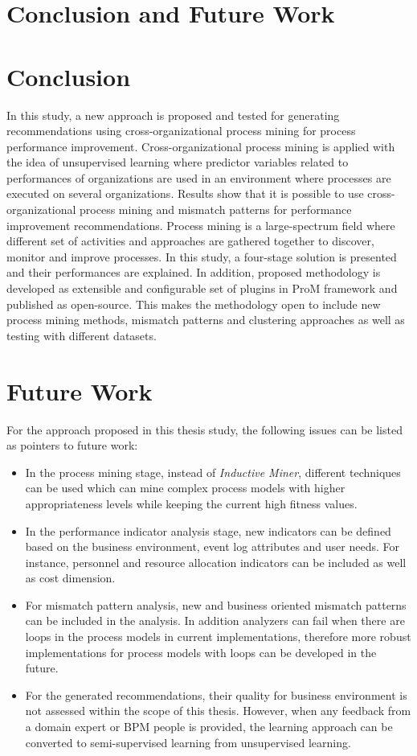 \section{Conclusion and Future Work}
\label{sec:conclusion-and-future-work}

\section{Conclusion}

In this study, a new approach is proposed and tested for generating recommendations using cross-organizational process mining for process performance improvement. Cross-organizational process mining is applied with the idea of unsupervised learning where predictor variables related to performances of organizations are used in an environment where processes are executed on several organizations. Results show that it is possible to use cross-organizational process mining and mismatch patterns for performance improvement recommendations. Process mining is a large-spectrum field where different set of activities and approaches are gathered together to discover, monitor and improve processes. In this  study, a four-stage solution is presented and their performances are explained. In addition, proposed methodology is developed as extensible and configurable set of plugins in ProM framework \cite{verbeek2010prom} and published as open-source. This makes the methodology open to include new process mining methods, mismatch patterns and clustering approaches as well as testing with different datasets.

\section{Future Work}

For the approach proposed in this thesis study, the following issues can be listed as pointers to future work:
\begin{itemize}
	\item In the process mining stage, instead of \textit{Inductive Miner}, different techniques can be used which can mine complex process models with higher appropriateness levels while keeping the current high fitness values.
	\item In the performance indicator analysis stage, new indicators can be defined based on the business environment, event log attributes and user needs. For instance, personnel and resource allocation indicators can be included as well as cost dimension.
	\item For mismatch pattern analysis, new and business oriented mismatch patterns can be included in the analysis. In addition analyzers can fail when there are loops in the process models in current implementations, therefore more robust implementations for process models with loops can be developed in the future.
	\item For the generated recommendations, their quality for business environment is not assessed within the scope of this thesis. However, when any feedback from a domain expert or BPM people is provided, the learning approach can be converted to semi-supervised learning from unsupervised learning.
\end{itemize}